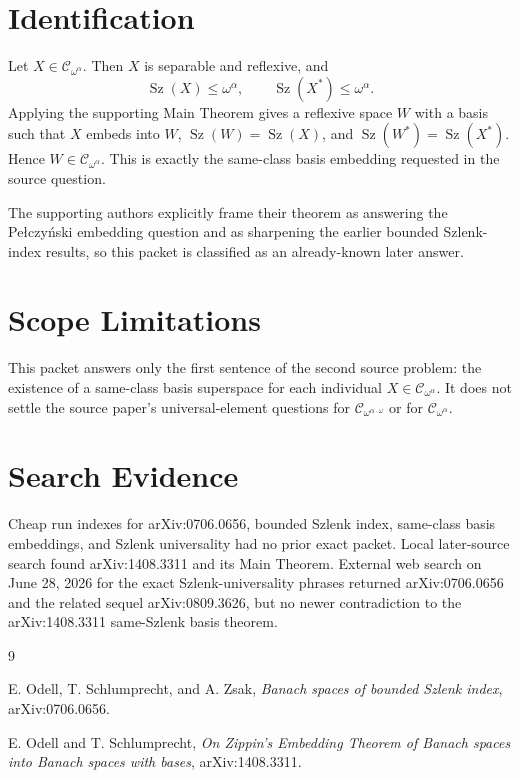\documentclass[11pt]{article}
\newcommand{\Sz}{\operatorname{Sz}}
\newcommand{\cC}{\mathcal{C}}
\begin{document}
\section*{Identification}

Let \(X\in \cC_{\omega^\alpha}\).  Then \(X\) is separable and reflexive, and
\[
  \Sz(X)\leq \omega^\alpha,
  \qquad
  \Sz(X^*)\leq \omega^\alpha .
\]
Applying the supporting Main Theorem gives a reflexive space \(W\) with a
basis such that \(X\) embeds into \(W\), \(\Sz(W)=\Sz(X)\), and
\(\Sz(W^*)=\Sz(X^*)\).  Hence \(W\in\cC_{\omega^\alpha}\).  This is exactly
the same-class basis embedding requested in the source question.

The supporting authors explicitly frame their theorem as answering the
Pe{\l}czy\'nski embedding question and as sharpening the earlier bounded
Szlenk-index results, so this packet is classified as an already-known later
answer.

\section*{Scope Limitations}

This packet answers only the first sentence of the second source problem: the
existence of a same-class basis superspace for each individual
\(X\in\cC_{\omega^\alpha}\).  It does not settle the source paper's
universal-element questions for \(\cC_{\omega^{\alpha\cdot\omega}}\) or for
\(\cC_{\omega^\alpha}\).

\section*{Search Evidence}

Cheap run indexes for arXiv:0706.0656, bounded Szlenk index, same-class
basis embeddings, and Szlenk universality had no prior exact packet.
Local later-source search found arXiv:1408.3311 and its Main Theorem.
External web search on June 28, 2026 for the exact Szlenk-universality
phrases returned arXiv:0706.0656 and the related sequel arXiv:0809.3626, but
no newer contradiction to the arXiv:1408.3311 same-Szlenk basis theorem.

\begin{thebibliography}{9}

E. Odell, T. Schlumprecht, and A. Zsak,
\emph{Banach spaces of bounded Szlenk index}, arXiv:0706.0656.

E. Odell and T. Schlumprecht,
\emph{On Zippin's Embedding Theorem of Banach spaces into Banach spaces with
bases}, arXiv:1408.3311.

\end{thebibliography}
\end{document}
